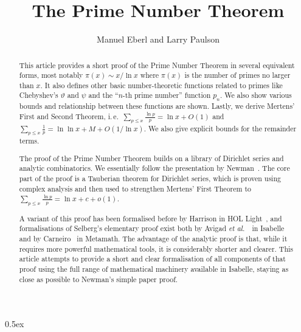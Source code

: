 \documentclass[11pt,a4paper]{article}
\begin{document}
\title{The Prime Number Theorem}
\author{Manuel Eberl and Larry Paulson}
\maketitle

\begin{abstract}
This article provides a short proof of the Prime Number Theorem in several equivalent forms, most notably $\pi(x)\sim x / \ln x$ where $\pi(x)$ is the number of primes no larger than $x$. It also defines other basic number-theoretic functions related to primes like Chebyshev's $\vartheta$ and $\psi$ and the ``$n$-th prime number'' function $p_n$. We also show various bounds and relationship between these functions are shown. Lastly, we derive Mertens' First and Second Theorem, i.\,e.\ $\sum_{p\leq x} \frac{\ln p}{p} = \ln x + O(1)$ and $\sum_{p\leq x} \frac{1}{p} = \ln\ln x + M + O(1/\ln x)$. We also give explicit bounds for the remainder terms.

The proof of the Prime Number Theorem builds on a library of Dirichlet series and analytic combinatorics. We essentially follow the presentation by Newman~\cite{newman1998analytic}. The core part of the proof is a Tauberian theorem for Dirichlet series, which is proven using complex analysis and then used to strengthen Mertens' First Theorem to $\sum_{p\leq x} \frac{\ln p}{p} = \ln x + c + o(1)$.

A variant of this proof has been formalised before by Harrison in HOL Light~\cite{harrison-pnt}, and formalisations of Selberg's elementary proof exist both by Avigad \textit{et al.}\ \cite{avigad_pnt}\ in Isabelle and by Carneiro~\cite{carneiro_pnt} in Metamath.
The advantage of the analytic proof is that, while it requires more powerful mathematical tools, it is considerably shorter and clearer. This article attempts to provide a short and clear formalisation of all components of that proof using the full range of mathematical machinery available in Isabelle, staying as close as possible to Newman's simple paper proof.
\end{abstract}

\newpage
\tableofcontents
\newpage
\parindent 0pt\parskip 0.5ex





\end{document}
